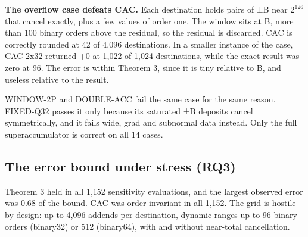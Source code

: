 \documentclass[3p,10pt]{elsarticle}
\begin{document}
\textbf{The overflow case defeats CAC.} Each destination holds pairs of
±B near \(2^{126}\) that cancel exactly, plus a few values of order one.
The window sits at B, more than 100 binary orders above the residual, so
the residual is discarded. CAC is correctly rounded at 42 of 4,096
destinations. In a smaller instance of the case, CAC-2x32 returned +0 at
1,022 of 1,024 destinations, while the exact result was zero at 96. The
error is within Theorem 3, since it is tiny relative to B, and useless
relative to the result.

WINDOW-2P and DOUBLE-ACC fail the same case for the same reason.
FIXED-Q32 passes it only because its saturated ±B deposits cancel
symmetrically, and it fails wide, grad and subnormal data instead. Only
the full superaccumulator is correct on all 14 cases.

\hypertarget{the-error-bound-under-stress-rq3}{%
\subsection{The error bound under stress
(RQ3)}\label{the-error-bound-under-stress-rq3}}

Theorem 3 held in all 1,152 sensitivity evaluations, and the largest
observed error was 0.68 of the bound. CAC was order invariant in all
1,152. The grid is hostile by design: up to 4,096 addends per
destination, dynamic ranges up to 96 binary orders (binary32) or 512
(binary64), with and without near-total cancellation.
\end{document}
